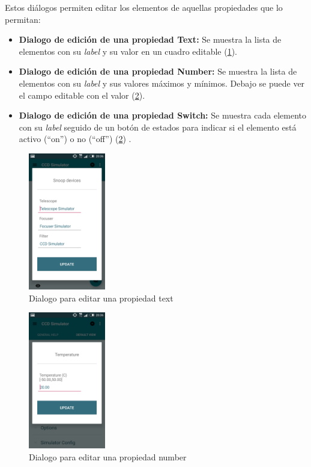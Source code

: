 Estos diálogos permiten editar los elementos de aquellas propiedades que lo permitan:

\begin{itemize}
  \item \textbf{Dialogo de edición de una propiedad Text:} Se muestra la lista de elementos con su \textit{label} y su valor en un cuadro editable (\ref{fig:text_edit}).
  \item \textbf{Dialogo de edición de una propiedad Number:} Se muestra la lista de elementos con su \textit{label} y sus valores máximos y mínimos. Debajo se puede ver el campo editable con el valor (\ref{fig:number_edit}).
  \item \textbf{Dialogo de edición de una propiedad Switch:} Se muestra cada elemento con su \textit{label} seguido de un botón de estados para indicar si el elemento está activo (``on'') o no (``off'') (\ref{fig:number_edit}) .
\end{itemize}


\begin{figure}[!ht]
  \begin{center}
  \includegraphics[width=0.3\textwidth]{../images/text_edit_view.png}
  \caption{Dialogo para editar una propiedad text}
  \label{fig:text_edit}
  \end{center}
\end{figure}


\begin{figure}[!ht]
  \begin{center}
  \includegraphics[width=0.3\textwidth]{../images/number_edit_view.png}
  \caption{Dialogo para editar una propiedad number}
  \label{fig:number_edit}
  \end{center}
\end{figure}


